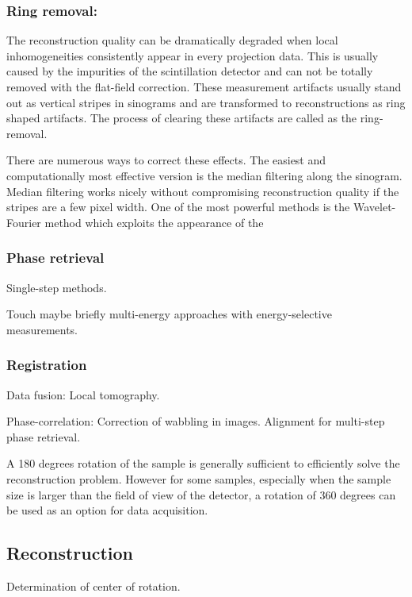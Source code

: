 \documentclass[pdf]{iucr}              %
\begin{document}
\subsubsection{Ring removal:}

The reconstruction quality can be dramatically degraded when local inhomogeneities consistently appear in every projection data.  This is usually caused by the impurities of the scintillation detector and can not be totally removed with the flat-field correction. These measurement artifacts usually stand out as vertical stripes in sinograms and are transformed to reconstructions as ring shaped artifacts. The process of clearing these artifacts are called as the ring-removal. 

There are numerous ways to correct these effects. The easiest and computationally most effective version is the median filtering along the sinogram. Median filtering works nicely without compromising reconstruction quality if the stripes are a few pixel width. One of the most powerful methods is the Wavelet-Fourier method which exploits the appearance of the 

\subsubsection{Phase retrieval}

Single-step methods. 

Touch maybe briefly multi-energy approaches with energy-selective measurements.


\subsubsection{Registration}

Data fusion: Local tomography. 

Phase-correlation: Correction of wabbling in images. Alignment for multi-step phase retrieval.

A 180 degrees rotation of the sample is generally sufficient to efficiently solve the reconstruction problem. However for some samples, especially when the sample size is larger than the field of view of the detector, a  rotation of 360 degrees can be used as an option for data acquisition. 

\subsection{Reconstruction}

Determination of center of rotation.
\end{document}
